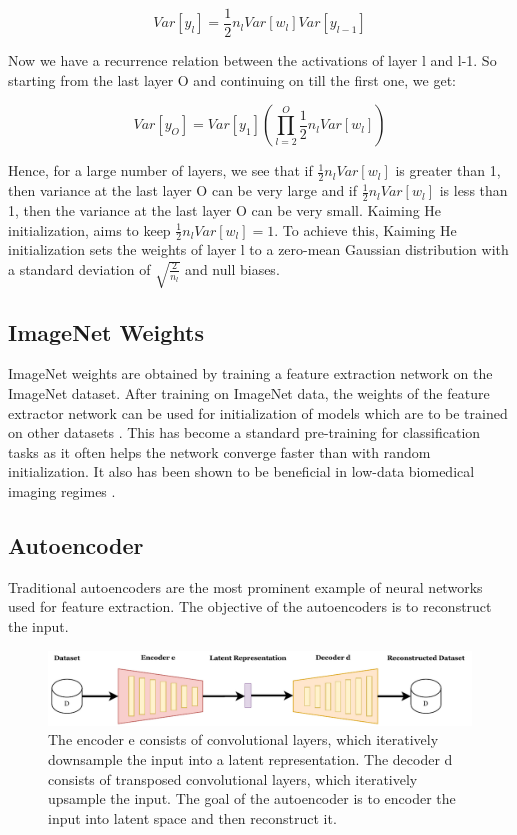 \begin{equation}
    \label{equation:replaced_expectation_forward_pass}
    Var[y_l] = \frac{1}{2}n_l Var[w_l]Var[y_{l-1}]
\end{equation}

Now we have a recurrence relation between the activations of layer l and l-1. So starting from the last layer O and continuing on till the first one, we get:

\begin{equation}
    \label{equation:final_layers_forward_pass}
    Var[y_O] = Var[y_1] \left( \prod_{l=2}^{O} \frac{1}{2}n_l Var[w_l] \right)
\end{equation}

Hence, for a large number of layers, we see that if $\frac{1}{2}n_l Var[w_l]$ is greater than 1, then variance at the last layer O can be very large and if $\frac{1}{2}n_l Var[w_l]$ is less than 1, then the variance at the last layer O can be very small. Kaiming He initialization, aims to keep $\frac{1}{2}n_l Var[w_l] = 1$. To achieve this, Kaiming He initialization sets the weights of layer l to a zero-mean Gaussian distribution with a standard deviation of $\sqrt{\frac{2}{n_l}}$ and null biases.

\subsection{ImageNet Weights}
ImageNet weights are obtained by training a feature extraction network on the ImageNet dataset. After training on ImageNet data, the weights of the feature extractor network can be used for initialization of models which are to be trained on other datasets \cite{raghu2019}. This has become a standard pre-training for classification tasks as it often helps the network converge faster than with random initialization. It also has been shown to be beneficial in low-data biomedical imaging regimes \cite{raghu2019}. 

\subsection{Autoencoder}
Traditional autoencoders\cite{kramer1991} are the most prominent example of neural networks used for feature extraction. The objective of the autoencoders is to reconstruct the input. 

\begin{figure}[htbp]
\centering
\captionsetup{format=plain}
\includegraphics[keepaspectratio,width=\textwidth]{figures/fig_autoencoder.pdf}
\caption{The encoder e consists of convolutional layers, which iteratively downsample the input into a latent representation. The decoder d consists of transposed convolutional layers, which iteratively upsample the input. The goal of the autoencoder is to encoder the input into latent space and then reconstruct it.}
\label{fig:autoencoder}
\end{figure}

